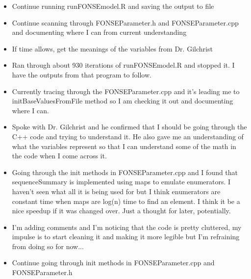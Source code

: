 \documentclass[letterpaper,index=totoc,hyperref,openany]{labbook} %
\begin{document}

\begin{itemize}
	\item Continue running runFONSEmodel.R and saving the output to file
	\item Continue scanning through FONSEParameter.h and FONSEParameter.cpp and documenting where I can from current understanding
	\item If time allows, get the meanings of the variables from Dr. Gilchrist 
\end{itemize}

\begin{itemize}
	\item Ran through about 930 iterations of runFONSEmodel.R and stopped it. I have the outputs from that program to follow.
	\item Currently tracing through the FONSEParameter.cpp and it's leading me to initBaseValuesFromFile method so I am checking it out and documenting where I can.
	\item Spoke with Dr. Gilchrist and he confirmed that I should be going through the C++ code and trying to understand it. He also gave me an understanding of what the variables represent so that I can understand some of the math in the code when I come across it.
	\item Going through the init methods in FONSEParameter.cpp and I found that sequenceSummary is implemented using maps to emulate enumerators. I haven't seen what all it is being used for but I think enumerators are constant time when maps are log(n) time to find an element. I think it be a nice speedup if it was changed over. Just a thought for later, potentially.
	\item I'm adding comments and I'm noticing that the code is pretty cluttered, my impulse is to start cleaning it and making it more legible but I'm refraining from doing so for now...
\end{itemize}


\begin{itemize}
	\item Continue going through init methods in FONSEParameter.cpp and FONSEParameter.h
\end{itemize}
\end{document}
